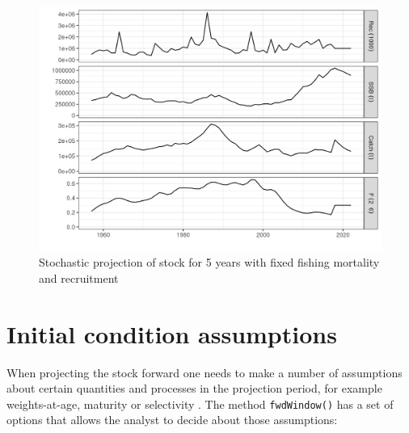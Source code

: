 \documentclass[
]{book}
\begin{document}
\begin{figure}
\centering
\includegraphics{_bookdown_files/_main_files/figure-html/unnamed-chunk-117-1.png}
\caption{\label{fig:unnamed-chunk-117}Stochastic projection of stock for 5 years with fixed fishing mortality and recruitment}
\end{figure}

\hypertarget{initial-condition-assumptions}{%
\section{Initial condition assumptions}\label{initial-condition-assumptions}}

When projecting the stock forward one needs to make a number of assumptions about certain quantities and processes in the projection period, for example weights-at-age, maturity or selectivity . The method \texttt{fwdWindow()} has a set of options that allows the analyst to decide about those assumptions:
\end{document}
